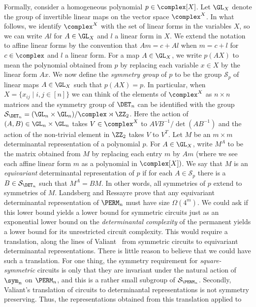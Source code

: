 \documentclass[11pt]{article}
\begin{document}
Formally, consider a homogeneous polynomial $p \in \complex[X]$.  Let
$\GL_X$ denote the group of invertible linear maps on the vector space
$\complex^X$.  In what follows, we identify $\complex^X$ with the set
of linear forms in the variables $X$, so we can write $Al$ for
$A \in \GL_X$ and $l$ a linear form in $X$.  We extend the notation to
affine linear forms %
%
by the convention that $Am = c + Al$ when $m = c+
l$ for $c \in \complex$ and $l$ a linear form.
For a map $A \in \GL_X$, we write $p(AX)$ to mean the polynomial obtained from $p$ by replacing each variable $x \in X$ by the linear form $Ax$.  We now define the \emph{symmetry group} of $p$ to be the group $\mathcal{S}_p$ of linear maps $A \in \GL_X$ such that $p(AX) = p$.  In particular, when $X = \{x_{ij} \mid i,j \in [n] \}$ we can think of the elements of $\complex^X$ as $n \times n$ matrices and the symmetry group of $\DET_n$ can be identified with the group $\mathcal{S}_{\DET_n} = (\GL_n \times \GL_n)/\complex \rtimes \ZZ_2$.  Here the action of $(A,B) \in  \GL_n \times \GL_n$ takes $V \in \complex^X$ to $AVB^{-1}/\det(AB^{-1})$ and the action of the non-trivial element in $\ZZ_2$ takes $V$ to $V^T$.
Let  $M$ be an $m\times m$ determinantal representation of a polynomial $p$.  For $A \in \GL_X$, write $M^A$ to be the matrix obtained from $M$ by replacing each entry $m$ by $Am$ (where we see each affine linear form $m$ as a polynomial in $\complex[X])$.   We say that $M$ is an \emph{equivariant} determinantal representation of $p$ if for each $A \in \mathcal{S}_p$ there is a $B \in \mathcal{S}_{\DET_n}$ such that $M^A = BM$.  In other words, all symmetries of $p$ extend to symmetries of $M$.    Landsberg and Ressayre prove that any equivariant determinantal representation of $\PERM_n$ must have size $\Omega(4^m)$.
We could ask if this lower bound yields a lower bound for symmetric circuits just as an exponential lower bound on the \emph{determinantal complexity} of the permanent yields a lower bound for its unrestricted circuit complexity.  This would require a translation, along the lines of Valiant~\cite{Valiant79} from symmetric circuits to equivariant determinantal representations.  There is little reason to believe that we could have such a translation.  For one thing, the symmetry requirement for
\emph{square-symmetric} %
circuits is only that they are invariant under the natural action of $\sym_n$ on $\PERM_n$, and this is a rather small subgroup of $\mathcal{S}_{\PERM_n}$.  Secondly, Valiant's translation of circuits to determinantal representations is not symmetry preserving.  Thus, the representations obtained from this translation applied to
\end{document}
